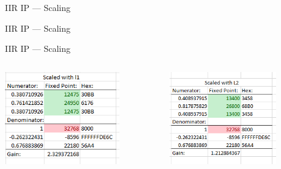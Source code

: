 \documentclass{beamer}
\begin{document}
\begin{frame}{IIR IP --- Scaling}
\end{frame}
\begin{frame}{IIR IP --- Scaling}
\end{frame}
\begin{frame}{IIR IP --- Scaling}
  \begin{columns}[T]
    \begin{column}[T]{5cm}
      \includegraphics[height=4cm]
                      {scaled-with-l1.png}
    \end{column}
    \begin{column}[T]{5cm}
      \includegraphics[height=4cm]
                      {scaled-with-L2.png}
    \end{column}
  \end{columns}
\end{frame}
\end{document}
